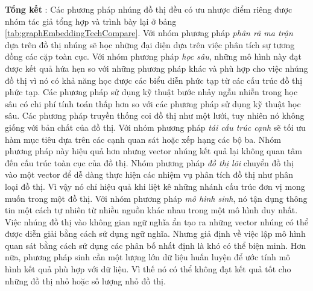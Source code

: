 \textbf{Tổng kết} : Các phương pháp nhúng đồ thị đều có ưu nhược điểm riêng được nhóm tác giả \cite{cai2018comprehensive} tổng hợp và trình bày lại ở bảng \ref{tab:graphEmbeddingTechCompare}. Với nhóm phương pháp \textit{phân rã ma trận} dựa trên đồ thị nhúng sẽ học những đại diện dựa trên việc phân tích sự tương đồng các cặp toàn cục. Với nhóm phương pháp \textit{học sâu}, những mô hình này đạt được kết quả hứa hẹn so với những phương pháp khác và phù hợp cho việc nhúng đồ thị vì nó có khả năng học được các biểu diễn phức tạp từ các cấu trúc đồ thị phức tạp. Các phương pháp sử dụng kỹ thuật bước nhảy ngẫu nhiễn trong học sâu có chi phí tính toán thấp hơn so với các phương pháp sử dụng kỹ thuật học sâu. Các phương pháp truyền thống coi đồ thị như một lưới, tuy nhiên nó không giống với bản chất của đồ thị. Với nhóm phương pháp \textit{tái cấu trúc cạnh} sẽ tối ưu hàm mục tiêu dựa trên các cạnh quan sát hoặc xếp hạng các bộ ba. Nhóm phương pháp này hiệu quả hơn nhưng vector nhúng kết quả lại không quan tâm đến cấu trúc toàn cục của đồ thị. Nhóm phương pháp \textit{đồ thị lõi} chuyển đồ thị vào một vector để dễ dàng thực hiện các nhiệm vụ phân tích đồ thị như phân loại đồ thị. Vì vậy nó chỉ hiệu quả khi liệt kê những nhánh cấu trúc đơn vị mong muốn trong một đồ thị. Với nhóm phương pháp \textit{mô hình sinh}, nó tận dụng thông tin một cách tự nhiên từ nhiều nguồn khác nhau trong một mô hình duy nhất. Việc nhúng đồ thị vào không gian ngữ nghĩa ẩn tạo ra những vector nhúng có thể được diễn giải bằng cách sử dụng ngữ nghĩa. Nhưng giả định về việc lập mô hình quan sát bằng cách sử dụng các phân bố nhất định là khó có thể biện minh. Hơn nữa, phương pháp sinh cần một lượng lớn dữ liệu huấn luyện để ước tính mô hình kết quả phù hợp với dữ liệu. Vì thế nó có thể không đạt kết quả tốt cho những đồ thị nhỏ hoặc số lượng nhỏ đồ thị.
